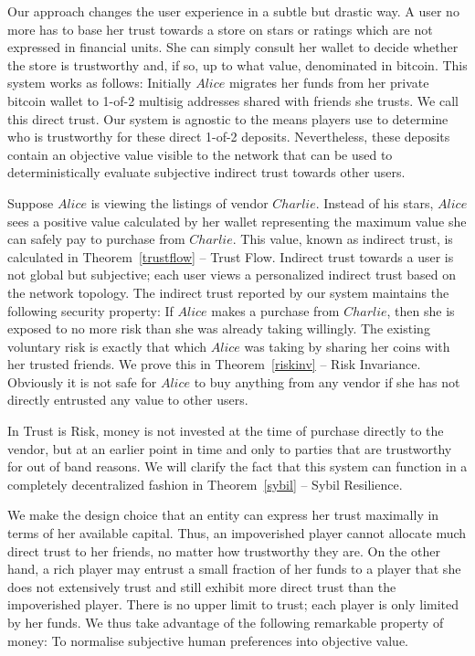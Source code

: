   Our approach changes the user experience in a subtle but drastic way. A user no more has to base her trust towards a
  store on stars or ratings which are not expressed in financial units. She can simply consult her wallet to decide whether
  the store is trustworthy and, if so, up to what value, denominated in bitcoin. This system works as follows: Initially
  $Alice$ migrates her funds from her private bitcoin wallet to 1-of-2 multisig addresses shared with friends she
  trusts. We call this direct trust. Our system is agnostic to the means players use to determine who is trustworthy for these
  direct 1-of-2 deposits. Nevertheless, these deposits contain an objective value visible to the network that can be used to
  deterministically evaluate subjective indirect trust towards other users.

  Suppose $Alice$ is viewing the listings of vendor $Charlie$. Instead of his stars, $Alice$ sees a positive value calculated
  by her wallet representing the maximum value she can safely pay to purchase from $Charlie$. This value, known as indirect
  trust, is calculated in Theorem~\ref{trustflow} -- Trust Flow. Indirect trust towards a user is not global but subjective;
  each user views a personalized indirect trust based on the network topology.  The indirect trust reported by our system
  maintains the following security property: If $Alice$ makes a purchase from $Charlie$, then she is exposed to no more risk
  than she was already taking willingly. The existing voluntary risk is exactly that which $Alice$ was taking by sharing her
  coins with her trusted friends. We prove this in Theorem~\ref{riskinv} -- Risk Invariance. Obviously it is not safe for
  $Alice$ to buy anything from any vendor if she has not directly entrusted any value to other users.

  In Trust is Risk, money is not invested at the time of purchase directly to the vendor, but at an earlier point in time and
  only to parties that are trustworthy for out of band reasons. We will clarify the fact that this system can function in a
  completely decentralized fashion in Theorem~\ref{sybil} -- Sybil Resilience.

  We make the design choice that an entity can express her trust maximally in terms of her available capital. Thus, an
  impoverished player cannot allocate much direct trust to her friends, no matter how trustworthy they are. On the other hand,
  a rich player may entrust a small fraction of her funds to a player that she does not extensively trust and still exhibit
  more direct trust than the impoverished player. There is no upper limit to trust; each player is only limited by her funds.
  We thus take advantage of the following remarkable property of money: To normalise subjective human preferences into
  objective value.

